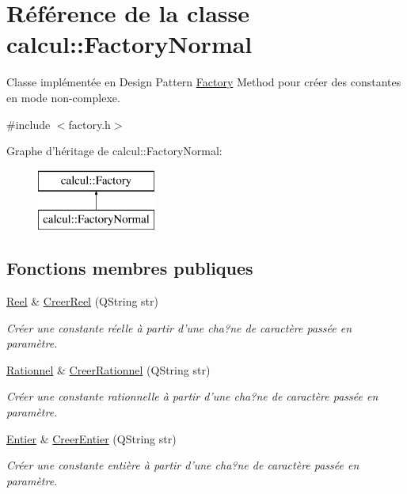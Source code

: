 \hypertarget{classcalcul_1_1_factory_normal}{\section{Référence de la classe calcul\-:\-:Factory\-Normal}
\label{classcalcul_1_1_factory_normal}
}


Classe implémentée en Design Pattern \hyperlink{classcalcul_1_1_factory}{Factory} Method pour créer des constantes en mode non-\/complexe.  




{\ttfamily \#include $<$factory.\-h$>$}

Graphe d'héritage de calcul\-:\-:Factory\-Normal\-:\begin{figure}[H]
\begin{center}
\leavevmode
\includegraphics[height=2.000000cm]{classcalcul_1_1_factory_normal}
\end{center}
\end{figure}
\subsection*{Fonctions membres publiques}
\begin{DoxyCompactItemize}
\item 
\hyperlink{classcalcul_1_1_reel}{Reel} \& \hyperlink{classcalcul_1_1_factory_normal_a384ce0e05a619761d91ba08bd48729a1}{Creer\-Reel} (Q\-String str)
\begin{DoxyCompactList}\small\item\em Créer une constante réelle à partir d'une cha?ne de caractère passée en paramètre. \end{DoxyCompactList}\item 
\hyperlink{classcalcul_1_1_rationnel}{Rationnel} \& \hyperlink{classcalcul_1_1_factory_normal_a097039535ac042f0e15d0cd2473eb6f2}{Creer\-Rationnel} (Q\-String str)
\begin{DoxyCompactList}\small\item\em Créer une constante rationnelle à partir d'une cha?ne de caractère passée en paramètre. \end{DoxyCompactList}\item 
\hyperlink{classcalcul_1_1_entier}{Entier} \& \hyperlink{classcalcul_1_1_factory_normal_aa5214b571ca6e95c2fc61afd7a761680}{Creer\-Entier} (Q\-String str)
\begin{DoxyCompactList}\small\item\em Créer une constante entière à partir d'une cha?ne de caractère passée en paramètre. \end{DoxyCompactList}\end{DoxyCompactItemize}


